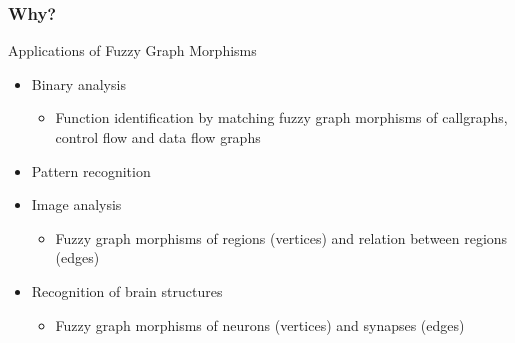 


\begin{frame}
	\frametitle{Why?}

	\begin{block}{Applications of Fuzzy Graph Morphisms}
		\begin{itemize}
			\item Binary analysis
			\begin{itemize}
				\item Function identification by matching fuzzy graph morphisms of callgraphs, control flow and data flow graphs
			\end{itemize}
			\item Pattern recognition
			\item Image analysis
			\begin{itemize}
				\item Fuzzy graph morphisms of regions (vertices) and relation between regions (edges)
			\end{itemize}
			\item Recognition of brain structures
			\begin{itemize}
				\item Fuzzy graph morphisms of neurons (vertices) and synapses (edges)
			\end{itemize}
		\end{itemize}
	\end{block}
\end{frame}
